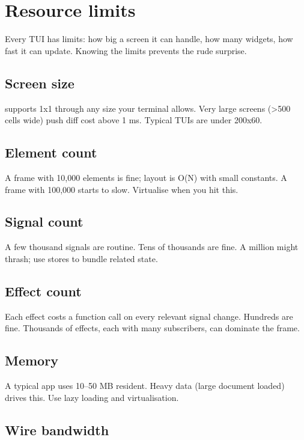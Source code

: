 \chapter{Resource limits}
\label{ch:limits}

\begin{aside}
Every TUI has limits: how big a screen it can handle, how
many widgets, how fast it can update. Knowing the limits
prevents the rude surprise.
\end{aside}

\section{Screen size}

\maya{} supports 1x1 through any size your terminal allows.
Very large screens (>500 cells wide) push diff cost above
1 ms. Typical TUIs are under 200x60.

\section{Element count}

A frame with 10,000 elements is fine; layout is O(N) with
small constants. A frame with 100,000 starts to slow.
Virtualise when you hit this.

\section{Signal count}

A few thousand signals are routine. Tens of thousands are
fine. A million might thrash; use stores to bundle related
state.

\section{Effect count}

Each effect costs a function call on every relevant signal
change. Hundreds are fine. Thousands of effects, each with
many subscribers, can dominate the frame.

\section{Memory}

A typical \maya{} app uses 10--50 MB resident. Heavy data
(large document loaded) drives this. Use lazy loading and
virtualisation.

\section{Wire bandwidth}

